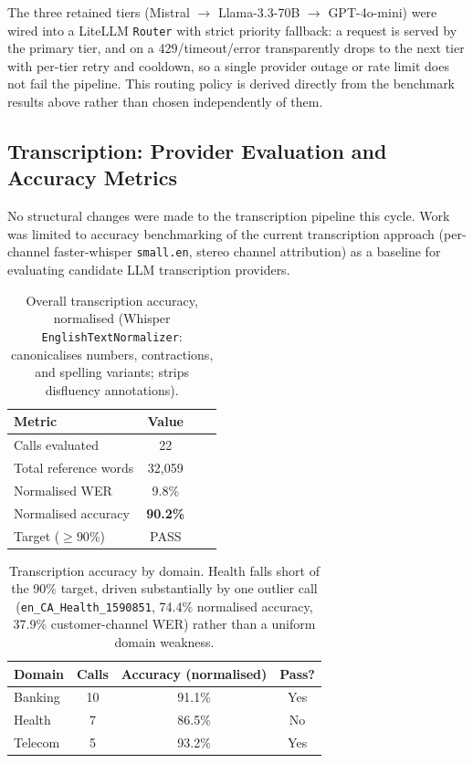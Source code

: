 The three retained tiers (Mistral $\to$ Llama-3.3-70B $\to$
GPT-4o-mini) were wired into a LiteLLM \texttt{Router} with strict
priority fallback: a request is served by the primary tier, and on a
429/timeout/error transparently drops to the next tier with per-tier
retry and cooldown, so a single provider outage or rate limit does not
fail the pipeline. This routing policy is derived directly from the
benchmark results above rather than chosen independently of them.

\subsection{Transcription: Provider Evaluation and Accuracy Metrics}

No structural changes were made to the transcription pipeline this
cycle. Work was limited to accuracy benchmarking of the current
transcription approach (per-channel faster-whisper \texttt{small.en},
stereo channel attribution) as a baseline for evaluating candidate LLM
transcription providers.

\begin{table}[h]
\centering
\begin{tabular}{lccc}
\hline
\textbf{Metric} & \textbf{Value} \\
\hline
Calls evaluated & 22 \\
Total reference words & 32{,}059 \\
Normalised WER & 9.8\% \\
Normalised accuracy & \textbf{90.2\%} \\
Target ($\geq 90\%$) & PASS \\
\hline
\end{tabular}
\caption{Overall transcription accuracy, normalised (Whisper
\texttt{EnglishTextNormalizer}: canonicalises numbers, contractions, and
spelling variants; strips disfluency annotations).}
\end{table}

\begin{table}[h]
\centering
\begin{tabular}{lccc}
\hline
\textbf{Domain} & \textbf{Calls} & \textbf{Accuracy (normalised)} & \textbf{Pass?} \\
\hline
Banking & 10 & 91.1\% & Yes \\
Health  & 7  & 86.5\% & No \\
Telecom & 5  & 93.2\% & Yes \\
\hline
\end{tabular}
\caption{Transcription accuracy by domain. Health falls short of the
90\% target, driven substantially by one outlier call
(\texttt{en\_CA\_Health\_1590851}, 74.4\% normalised accuracy, 37.9\%
customer-channel WER) rather than a uniform domain weakness.}
\end{table}
